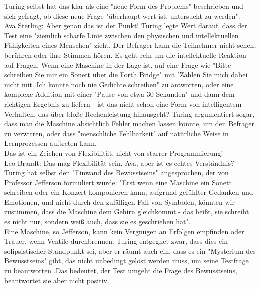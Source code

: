 \documentclass[a4paper,12pt]{scrartcl}
\begin{document}
Turing selbst hat das klar als eine "neue Form des Problems" beschrieben und sich gefragt, ob diese neue Frage "überhaupt wert ist, untersucht zu werden".\\
Ava Sterling: Aber genau das ist der Punkt! Turing legte Wert darauf, dass der Test eine "ziemlich scharfe Linie zwischen den physischen und intellektuellen Fähigkeiten eines Menschen" zieht. Der Befrager kann die Teilnehmer nicht sehen, berühren oder ihre Stimmen hören. Es geht rein um die intellektuelle Reaktion auf Fragen. Wenn eine Maschine in der Lage ist, auf eine Frage wie "Bitte schreiben Sie mir ein Sonett über die Forth Bridge" mit "Zählen Sie mich dabei nicht mit. Ich konnte noch nie Gedichte schreiben" zu antworten, oder eine komplexe Addition mit einer "Pause von etwa 30 Sekunden" und dann dem richtigen Ergebnis zu liefern - ist das nicht schon eine Form von intelligentem Verhalten, das über bloße Rechenleistung hinausgeht? Turing argumentiert sogar, dass man die Maschine absichtlich Fehler machen lassen könnte, um den Befrager zu verwirren, oder dass "menschliche Fehlbarkeit" auf natürliche Weise in Lernprozessen auftreten kann.\\
Das ist ein Zeichen von Flexibilität, nicht von starrer Programmierung!\\
Leo Brandt: Das mag Flexibilität sein, Ava, aber ist es echtes Verständnis? Turing hat selbst den "Einwand des Bewusstseins" angesprochen, der von Professor Jefferson formuliert wurde: "Erst wenn eine Maschine ein Sonett schreiben oder ein Konzert komponieren kann, aufgrund gefühlter Gedanken und Emotionen, und nicht durch den zufälligen Fall von Symbolen, könnten wir zustimmen, dass die Maschine dem Gehirn gleichkommt - das heißt, sie schreibt es nicht nur, sondern weiß auch, dass sie es geschrieben hat".\\ 
Eine Maschine, so Jefferson, kann kein Vergnügen an Erfolgen empfinden oder Trauer, wenn Ventile durchbrennen. Turing entgegnet zwar, dass dies ein solipsistischer Standpunkt sei, aber er räumt auch ein, dass es ein "Mysterium des Bewusstseins" gibt, das nicht unbedingt gelöst werden muss, um seine Testfrage zu beantworten .Das bedeutet, der Test umgeht die Frage des Bewusstseins, beantwortet sie aber nicht positiv.\\
\end{document}
